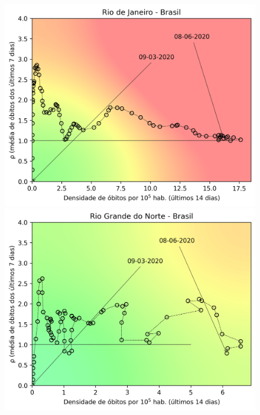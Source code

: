 \documentclass[]{article}
\begin{document}
\begin{figure}[!h]
	\begin{minipage}[t]{4cm}
		\centering
		\includegraphics[scale=0.5]{../RJ.png}
	\end{minipage}
	\hspace{5cm}
	\begin{minipage}[t]{4cm}
		\centering
		\includegraphics[scale=0.5]{../RN.png}
		\vspace{0.2cm}
	\end{minipage}
	

\end{figure}
\end{document}

